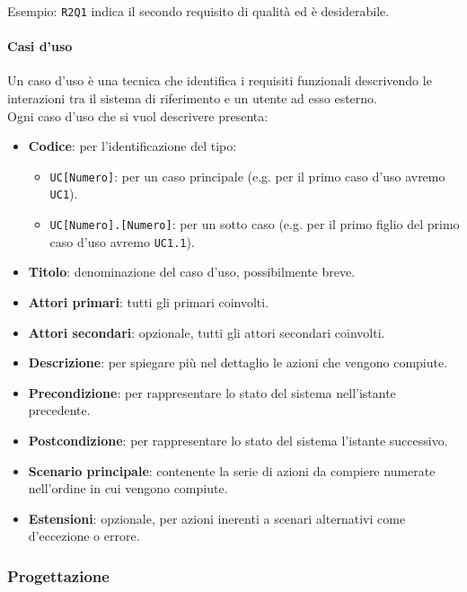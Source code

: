 		Esempio: \texttt{R2Q1} indica il secondo requisito di qualità ed è desiderabile.
	

		\paragraph{Casi d'uso}\label{PP:Sviluppo:AdR:CasiUso}
		Un caso d'uso è una tecnica che identifica i requisiti funzionali descrivendo le interazioni tra il sistema di riferimento e un utente ad esso esterno.\\
		Ogni caso d'uso che si vuol descrivere presenta:
		\begin{itemize}
		 	\item \textbf{Codice}: per l'identificazione del tipo:
		 	\begin{itemize}
		 		\item \texttt{UC[Numero]}: per un caso principale (e.g. per il primo caso d'uso avremo \texttt{UC1}).
		 		\item \texttt{UC[Numero].[Numero]}: per un sotto caso (e.g. per il primo figlio del primo caso d'uso avremo \texttt{UC1.1}).
		 	\end{itemize}
		 	\item \textbf{Titolo}: denominazione del caso d'uso, possibilmente breve.
		 	\item \textbf{Attori primari}: tutti gli  primari coinvolti.
		 	\item \textbf{Attori secondari}: opzionale, tutti gli attori secondari coinvolti.		 	
		 	\item \textbf{Descrizione}: per spiegare più nel dettaglio le azioni che vengono compiute.
		 	\item \textbf{Precondizione}: per rappresentare lo stato del sistema nell'istante precedente.
		 	\item \textbf{Postcondizione}: per rappresentare lo stato del sistema l'istante successivo.
		 	\item \textbf{Scenario principale}: contenente la serie di azioni da compiere numerate nell'ordine in cui vengono compiute.
		 	\item \textbf{Estensioni}: opzionale, per azioni inerenti a scenari alternativi come d'eccezione o errore.
		\end{itemize}

        \subsubsection{Progettazione}\label{PP:Sviluppo:Progettazione}	
        
